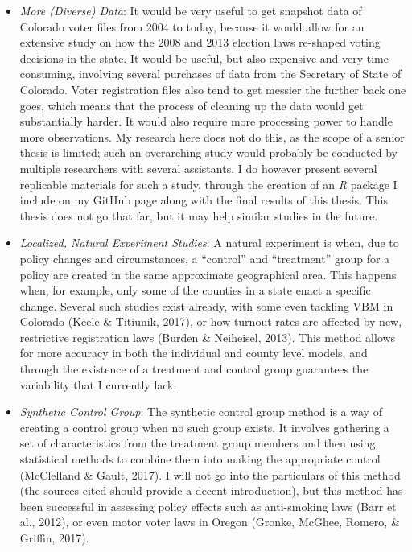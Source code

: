 \documentclass[12pt,twoside]{reedthesis}
\begin{document}
  \begin{itemize}
  \item
    \emph{More (Diverse) Data}: It would be very useful to get snapshot
    data of Colorado voter files from 2004 to today, because it would
    allow for an extensive study on how the 2008 and 2013 election laws
    re-shaped voting decisions in the state. It would be useful, but also
    expensive and very time consuming, involving several purchases of data
    from the Secretary of State of Colorado. Voter registration files also
    tend to get messier the further back one goes, which means that the
    process of cleaning up the data would get substantially harder. It
    would also require more processing power to handle more observations.
    My research here does not do this, as the scope of a senior thesis is
    limited; such an overarching study would probably be conducted by
    multiple researchers with several assistants. I do however present
    several replicable materials for such a study, through the creation of
    an \textit{R} package I include on my GitHub page along with the final
    results of this thesis. This thesis does not go that far, but it may
    help similar studies in the future.
  \item
    \emph{Localized, Natural Experiment Studies}: A natural experiment is
    when, due to policy changes and circumstances, a ``control'' and
    ``treatment'' group for a policy are created in the same approximate
    geographical area. This happens when, for example, only some of the
    counties in a state enact a specific change. Several such studies
    exist already, with some even tackling VBM in Colorado (Keele \&
    Titiunik, 2017), or how turnout rates are affected by new, restrictive
    registration laws (Burden \& Neiheisel, 2013). This method allows for
    more accuracy in both the individual and county level models, and
    through the existence of a treatment and control group guarantees the
    variability that I currently lack.
  \item
    \emph{Synthetic Control Group}: The synthetic control group method is
    a way of creating a control group when no such group exists. It
    involves gathering a set of characteristics from the treatment group
    members and then using statistical methods to combine them into making
    the appropriate control (McClelland \& Gault, 2017). I will not go
    into the particulars of this method (the sources cited should provide
    a decent introduction), but this method has been successful in
    assessing policy effects such as anti-smoking laws (Barr et al.,
    2012), or even motor voter laws in Oregon (Gronke, McGhee, Romero, \&
    Griffin, 2017).
  \end{itemize}
  
\end{document}
